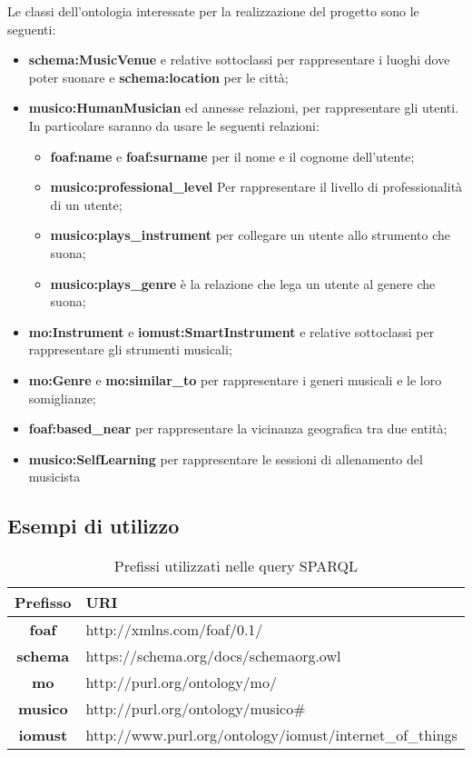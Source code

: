 \documentclass[12pt, a4paper]{article}
\begin{document}
Le classi dell'ontologia interessate per la realizzazione del progetto sono le seguenti:
\begin{itemize}
    \item \textbf{schema:MusicVenue} e relative sottoclassi per rappresentare i luoghi dove poter suonare e \textbf{schema:location} per le città;
    \item \textbf{musico:HumanMusician} ed annesse relazioni, per rappresentare gli utenti. In particolare saranno da usare le seguenti relazioni:
          \begin{itemize}
              \item \textbf{foaf:name} e \textbf{foaf:surname} per il nome e il cognome dell'utente;
              \item \textbf{musico:professional\_level} Per rappresentare il livello di professionalità di un utente;
              \item \textbf{musico:plays\_instrument} per collegare un utente allo strumento che suona;
              \item \textbf{musico:plays\_genre} è la relazione che lega un utente al genere che suona;
          \end{itemize}
    \item \textbf{mo:Instrument} e \textbf{iomust:SmartInstrument} e relative sottoclassi per rappresentare gli strumenti musicali;
    \item \textbf{mo:Genre} e \textbf{mo:similar\_to} per rappresentare i generi musicali e le loro somiglianze;
    \item \textbf{foaf:based\_near} per rappresentare la vicinanza geografica tra due entità;
    \item \textbf{musico:SelfLearning} per rappresentare le sessioni di allenamento del musicista
\end{itemize}

\subsection{Esempi di utilizzo}
\begin{table}[h]
    \begin{tabular}{|c|p{12cm}|}
        \hline \textbf{Prefisso} & \textbf{URI}                                             \\ \hline
        \textbf{foaf}            & http://xmlns.com/foaf/0.1/                               \\ \hline
        \textbf{schema}          & https://schema.org/docs/schemaorg.owl                    \\ \hline
        \textbf{mo}              & http://purl.org/ontology/mo/                             \\ \hline
        \textbf{musico}          & http://purl.org/ontology/musico\#                        \\ \hline
        \textbf{iomust}          & http://www.purl.org/ontology/iomust/internet\_of\_things \\ \hline
    \end{tabular}
    \caption{Prefissi utilizzati nelle query SPARQL}
\end{table}
\end{document}
